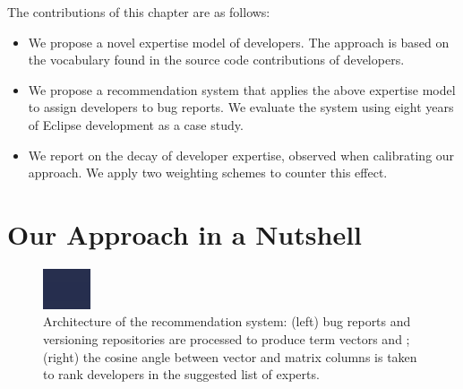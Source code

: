 The contributions of this chapter are as follows:
\begin{itemize}
\item We propose a novel expertise model of developers. The approach is based on the vocabulary found in the source code contributions of developers.

\item We propose a recommendation system that applies the above expertise model to assign developers to bug reports. We evaluate the system using eight years of Eclipse development as a case study. 

\item We report on the decay of developer expertise, observed when calibrating our approach. We apply two weighting schemes to counter this effect.
\end{itemize}

\section{Our Approach in a Nutshell}\label{sec:nutshell}

\begin{figure}
    \includegraphics[width=\linewidth]{FlowOfAlgo}
    \caption{Architecture of the \DEVLECT recommendation system: (left) bug reports and versioning repositories are processed to produce term vectors and \TAMS; (right) the cosine angle between vector and matrix columns is taken to rank developers in the suggested list of experts.}
    \label{fig:algo}
\end{figure} 

